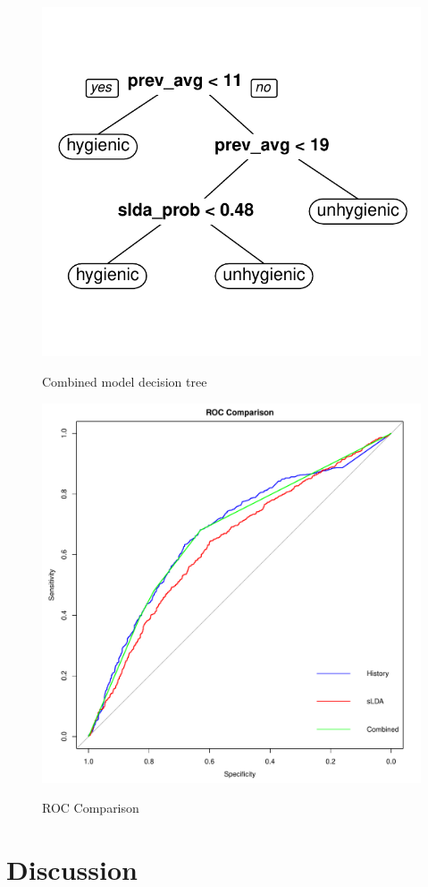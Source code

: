 \documentclass{article}
\begin{document}
\begin{figure}[h!]
\centering
\begin{minipage}{.5\textwidth}
  \centering
  \includegraphics[width=.8\linewidth]{decision_tree}
  \caption{}{Combined model decision tree}
  \label{tree}
\end{minipage}%
\begin{minipage}{.5\textwidth}
  \centering
  \includegraphics[width=.8\linewidth]{roc_compare}
  \caption{}{ROC Comparison}
  \label{ROC}
\end{minipage}
\end{figure}



\section{Discussion}
\end{document}
